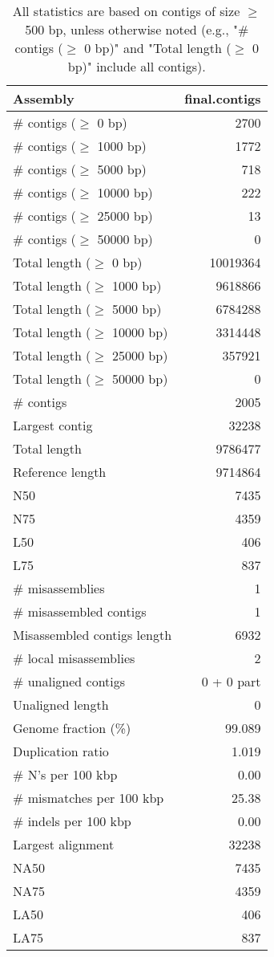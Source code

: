 \documentclass[12pt,a4paper]{article}
\begin{document}
\begin{table}[ht]
\begin{center}
\caption{All statistics are based on contigs of size $\geq$ 500 bp, unless otherwise noted (e.g., "\# contigs ($\geq$ 0 bp)" and "Total length ($\geq$ 0 bp)" include all contigs).}
\begin{tabular}{|l*{1}{|r}|}
\hline
Assembly & final.contigs \\ \hline
\# contigs ($\geq$ 0 bp) & 2700 \\ \hline
\# contigs ($\geq$ 1000 bp) & 1772 \\ \hline
\# contigs ($\geq$ 5000 bp) & 718 \\ \hline
\# contigs ($\geq$ 10000 bp) & 222 \\ \hline
\# contigs ($\geq$ 25000 bp) & 13 \\ \hline
\# contigs ($\geq$ 50000 bp) & 0 \\ \hline
Total length ($\geq$ 0 bp) & 10019364 \\ \hline
Total length ($\geq$ 1000 bp) & 9618866 \\ \hline
Total length ($\geq$ 5000 bp) & 6784288 \\ \hline
Total length ($\geq$ 10000 bp) & 3314448 \\ \hline
Total length ($\geq$ 25000 bp) & 357921 \\ \hline
Total length ($\geq$ 50000 bp) & 0 \\ \hline
\# contigs & 2005 \\ \hline
Largest contig & 32238 \\ \hline
Total length & 9786477 \\ \hline
Reference length & 9714864 \\ \hline
N50 & 7435 \\ \hline
N75 & 4359 \\ \hline
L50 & 406 \\ \hline
L75 & 837 \\ \hline
\# misassemblies & 1 \\ \hline
\# misassembled contigs & 1 \\ \hline
Misassembled contigs length & 6932 \\ \hline
\# local misassemblies & 2 \\ \hline
\# unaligned contigs & 0 + 0 part \\ \hline
Unaligned length & 0 \\ \hline
Genome fraction (\%) & 99.089 \\ \hline
Duplication ratio & 1.019 \\ \hline
\# N's per 100 kbp & 0.00 \\ \hline
\# mismatches per 100 kbp & 25.38 \\ \hline
\# indels per 100 kbp & 0.00 \\ \hline
Largest alignment & 32238 \\ \hline
NA50 & 7435 \\ \hline
NA75 & 4359 \\ \hline
LA50 & 406 \\ \hline
LA75 & 837 \\ \hline
\end{tabular}
\end{center}
\end{table}
\end{document}
